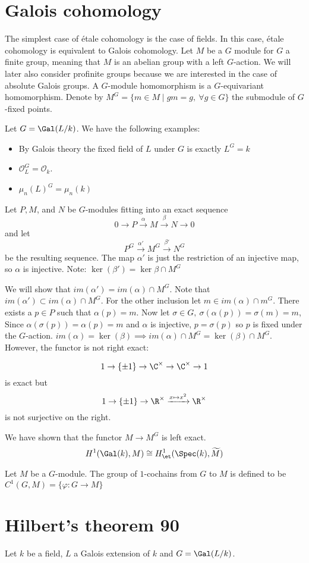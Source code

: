 \section{Galois cohomology}
The simplest case of \'etale cohomology is the case of fields. In this case, \'etale cohomology is equivalent to Galois cohomology.
Let $M$ be a $G$ module for $G$ a finite group, meaning that $M$ is an abelian group with a left $G$-action. We will later also consider profinite groups because we are interested in the case of absolute Galois groups. A $G$-module homomorphism is a $G$-equivariant homomorphism. Denote by $M^G = \{m \in M \mid gm = g, \ \forall g \in G\}$ the submodule of $G$-fixed points.
\begin{example}
	Let $G = \Gal(L/k)$. We have the following examples:
	\begin{itemize}
		\item By Galois theory the fixed field of $L$ under $G$ is exactly $L^G = k$
		\item $\mathcal{O}_L^G = \mathcal{O}_k$.
		\item $\mu_n(L)^G = \mu_n(k)$
	\end{itemize}
\end{example}

Let $P, M$, and $N$ be $G$-modules fitting into an exact sequence
\[
	0 \to P \xrightarrow{\alpha} M \xrightarrow{\beta} N \to 0
\]
and let
\[
	P^G \xrightarrow{\alpha'} M^G \xrightarrow{\beta'} N^G
\]
be the resulting sequence. The map $\alpha'$ is just the restriction of an injective map, so $\alpha$ is injective.
Note:
$\ker(\beta') = \ker \beta \cap M^G$

We will show that $im(\alpha') = im(\alpha) \cap M^G$.
Note that $im(\alpha') \subset im(\alpha) \cap M^G$.
For the other inclusion let $m \in im(\alpha) \cap m^G$. There exists a $p \in P$ such that $\alpha(p)=m$. Now let $\sigma \in G,\ \sigma(\alpha(p)) = \sigma(m) = m$,
Since $\alpha(\sigma(p)) = \alpha(p) = m$ and $\alpha$ is injective, $p = \sigma(p)$ so $p$ is fixed under the $G$-action. $im(\alpha) = \ker(\beta) \implies im(\alpha) \cap M^G = \ker(\beta) \cap M^G$.
However, the functor is not right exact:
\begin{example}
	\[1 \to \{\pm 1\} \to \C^\times \to \C^\times \to 1\]
	is exact but
	\[1 \to\{\pm 1\} \to \R^\times \xrightarrow{x \mapsto x^2} \R^\times\]
	is not surjective on the right.
\end{example}

We have shown that the functor $M \to M^G$ is left exact.
\[H^1(\Gal(k),M) \cong H_\text{\et}^1(\Spec(k), \widetilde{M})\]

\begin{definition}
	Let $M$ be a $G$-module. The group of $1$-cochains from $G$ to $M$ is defined to be  $C^1(G, M) = \{\varphi: G \to M\}$
\end{definition}

\section{Hilbert's theorem 90}
Let $k$ be a field, $L$ a Galois extension of $k$ and $G = \Gal(L/k)$.
